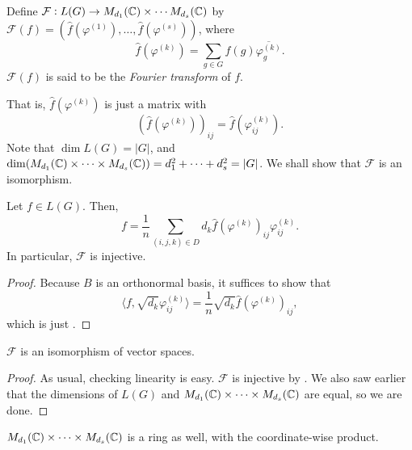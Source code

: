 		\begin{fdef}
			Define $\mathcal{F} : L(G) \to M_{d_1}(\mathbb{C}) \times \cdots M_{d_s}(\mathbb{C})$ by $\mathcal{F}(f) = (\hat{f}(\varphi^{(1)}),\ldots,\hat{f}(\varphi^{(s)}))$, where
			\[ \hat{f}(\varphi^{(k)}) = \sum_{g \in G} f(g) \overline{\varphi_g^{(k)}}. \]
			$\mathcal{F}(f)$ is said to be the \emph{Fourier transform} of $f$.
		\end{fdef}

		That is, $\hat{f}(\varphi^{(k)})$ is just a matrix with
		\begin{equation}
		\label{eqn: 3.2}
			\left(\hat{f}(\varphi^{(k)})\right)_{ij} = \hat{f}(\varphi^{(k)}_{ij}).
		\end{equation}
		Note that $\dim L(G) = |G|$, and $\dim (M_{d_1}(\mathbb{C}) \times \cdots \times M_{d_s}(\mathbb{C})) = d_1^2 + \cdots + d_s^2 = |G|$. We shall show that $\mathcal{F}$ is an isomorphism.

		\begin{flem}
			\label{theo: fourier is injective}
			Let $f \in L(G)$. Then,
			\[ f = \frac{1}{n} \sum_{(i,j,k) \in D} d_k \hat{f}(\varphi^{(k)})_{ij} \varphi_{ij}^{(k)}. \]
			In particular, $\mathcal{F}$ is injective.
		\end{flem}
		\begin{proof}
			Because $B$ is an orthonormal basis, it suffices to show that
			\[ \langle f , \sqrt{d_k} \varphi_{ij}^{(k)} \rangle = \frac{1}{n} \sqrt{d_k} \hat{f}(\varphi^{(k)})_{ij}, \]
			which is just .
		\end{proof}

		\begin{flem}
			$\mathcal{F}$ is an isomorphism of vector spaces.
		\end{flem}
		\begin{proof}
			As usual, checking linearity is easy. $\mathcal{F}$ is injective by . We also saw earlier that the dimensions of $L(G)$ and $M_{d_1}(\mathbb{C}) \times \cdots \times M_{d_s}(\mathbb{C})$ are equal, so we are done.
		\end{proof}

		$M_{d_1}(\mathbb{C}) \times \cdots \times M_{d_s}(\mathbb{C})$ is a ring as well, with the coordinate-wise product.

